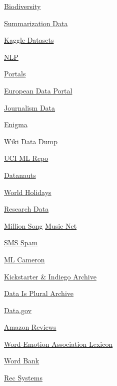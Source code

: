 \documentclass[]{book}
\begin{document}
\href{https://www.gbif.org}{Biodiversity}

\href{https://summari.es}{Summarization Data}

\href{https://www.kaggle.com/datasets}{Kaggle Datasets}

\href{https://github.com/niderhoff/nlp-datasets/blob/master/README.md}{NLP}

\href{https://www.opendatasoft.com/a-comprehensive-list-of-all-open-data-portals-around-the-world/}{Portals}

\href{http://www.europeandataportal.eu/}{European Data Portal}

\href{http://cjlab.stanford.edu/2015/09/30/lab-launch-and-data-sets/}{Journalism
Data}

\href{https://public.enigma.com/}{Enigma}

\href{http://dumps.wikimedia.org/other/pagecounts-raw/}{Wiki Data Dump}

\href{http://archive.ics.uci.edu/ml/}{UCI ML Repo}

\href{https://open.nasa.gov/explore/datanauts/}{Datanauts}

\href{https://date.nager.at/}{World Holidays}

\href{http://academictorrents.com/}{Research Data}

\href{https://labrosa.ee.columbia.edu/millionsong/}{Million Song}
\textbar{}
\href{https://homes.cs.washington.edu/~thickstn/musicnet.html}{Music
Net}

\href{http://www.esp.uem.es/jmgomez/smsspamcorpus/}{SMS Spam}

\href{https://gist.github.com/olivercameron/482dcfe8f34d66b536b1048eefe8b40d\#file-datasets-csv}{ML
Cameron}

\href{https://webrobots.io/kickstarter-datasets/}{Kickstarter \& Indiego
Archive}

\href{https://docs.google.com/spreadsheets/d/1wZhPLMCHKJvwOkP4juclhjFgqIY8fQFMemwKL2c64vk/edit\#gid=0}{Data
Is Plural Archive}

\href{http://www.data.gov/}{Data.gov}

\href{http://jmcauley.ucsd.edu/data/amazon/}{Amazon Reviews}

\href{http://saifmohammad.com/WebPages/NRC-Emotion-Lexicon.htm}{Word-Emotion
Association Lexicon}

\href{http://wordbank.stanford.edu/}{Word Bank}

\href{http://www.lab41.org/nine-datasets-for-investigating-recommender-systems/}{Rec
Systems}
\end{document}

